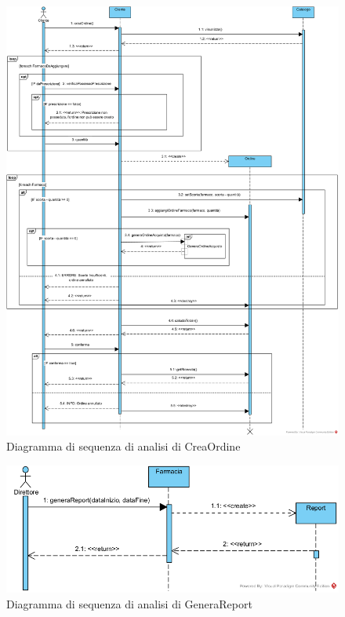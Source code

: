 \begin{figure}[!hbp]
	\centering
	\includegraphics[width=\linewidth]{assets/sequence_analisi/CreaOrdine.png}
	\caption{Diagramma di sequenza di analisi di CreaOrdine}
\end{figure}

\begin{figure}[!hbp]
	\centering
	\includegraphics[width=0.9\linewidth]{assets/sequence_analisi/GeneraReport.png}
	\caption{Diagramma di sequenza di analisi di GeneraReport}
\end{figure}

